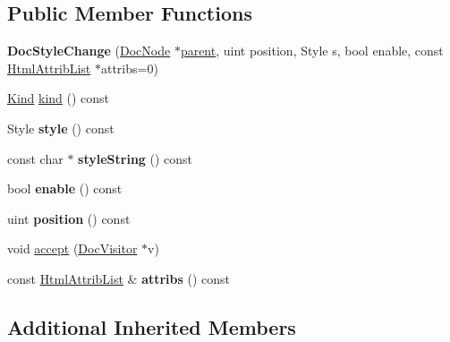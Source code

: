 \subsection*{Public Member Functions}
\begin{DoxyCompactItemize}
\item 
\mbox{\label{class_doc_style_change_a2b3b84ba022c755b0cb9be7da8383bb4}} 
{\bfseries Doc\+Style\+Change} (\mbox{\hyperlink{class_doc_node}{Doc\+Node}} $\ast$\mbox{\hyperlink{class_doc_node_a73e8ad29a91cfceb0968eb00db71a23d}{parent}}, uint position, Style s, bool enable, const \mbox{\hyperlink{class_html_attrib_list}{Html\+Attrib\+List}} $\ast$attribs=0)
\item 
\mbox{\hyperlink{class_doc_node_aebd16e89ca590d84cbd40543ea5faadb}{Kind}} \mbox{\hyperlink{class_doc_style_change_afcb88a076f2cabaeb4b6b10571d1a6b4}{kind}} () const
\item 
\mbox{\label{class_doc_style_change_a56d079390f264e34af453a015bd2e2c9}} 
Style {\bfseries style} () const
\item 
\mbox{\label{class_doc_style_change_a21689e3e2c3b35c3d438ebfff8f35da9}} 
const char $\ast$ {\bfseries style\+String} () const
\item 
\mbox{\label{class_doc_style_change_ac8a8c808b962cc17665ab52937b8bd78}} 
bool {\bfseries enable} () const
\item 
\mbox{\label{class_doc_style_change_af25a06edeb876f6589ad1de28cff84b8}} 
uint {\bfseries position} () const
\item 
void \mbox{\hyperlink{class_doc_style_change_aa6c460a097e12a52603f4560daf1125f}{accept}} (\mbox{\hyperlink{class_doc_visitor}{Doc\+Visitor}} $\ast$v)
\item 
\mbox{\label{class_doc_style_change_a9135e06181ecabdfce9c787fb4b44a71}} 
const \mbox{\hyperlink{class_html_attrib_list}{Html\+Attrib\+List}} \& {\bfseries attribs} () const
\end{DoxyCompactItemize}
\subsection*{Additional Inherited Members}



